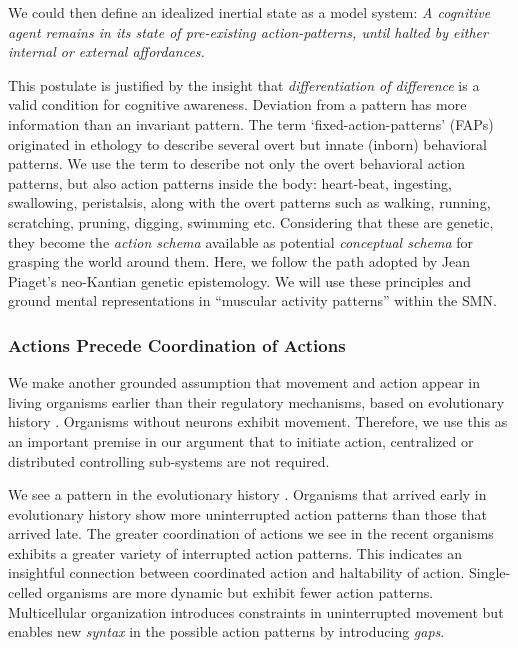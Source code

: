 We could then define an idealized inertial state as a model system:  \textit{A cognitive agent remains in its state of pre-existing action-patterns, until halted by either internal or external affordances.} 

This postulate is justified by the insight that \textit{differentiation of difference} is a valid condition for cognitive awareness.\cite{bateson2000steps} Deviation from a pattern has more information than an invariant pattern. The term `fixed-action-patterns' (FAPs) originated in ethology to describe several overt but innate (inborn) behavioral patterns. We use the term to describe not only the overt behavioral action patterns, but also action patterns inside the body: heart-beat, ingesting, swallowing, peristalsis, along with the overt patterns such as walking, running, scratching, pruning, digging, swimming etc.  Considering that these are genetic, they become the \textit{action schema} available as potential \textit{conceptual schema} for grasping the world around them.  Here, we follow the path adopted by Jean Piaget's neo-Kantian genetic epistemology.\cite{piaget-biology-knowledge}  We will use these principles and ground mental representations in ``muscular activity patterns'' within the SMN\cite{land-schack-2013frontiers}.

\subsubsection{Actions Precede Coordination of Actions}

We make another grounded assumption that movement and action appear in living organisms earlier than their regulatory mechanisms, based on evolutionary history \cite{Levin2014}.  Organisms without neurons exhibit movement. Therefore, we use this as an important premise in our argument that to initiate action, centralized or distributed controlling sub-systems are not required.  

We see a pattern in the evolutionary history \cite{Levin2014}.  Organisms that arrived early in evolutionary history show more uninterrupted action patterns than those that arrived late. The greater coordination of actions we see in the recent organisms exhibits a greater variety of interrupted action patterns. This indicates an insightful connection between coordinated action and haltability of action. Single-celled organisms are more dynamic but exhibit fewer action patterns. Multicellular organization introduces constraints in uninterrupted movement but enables new \textit{syntax} in the possible action patterns by introducing \textit{gaps}.  
